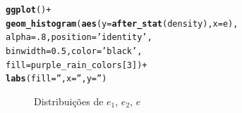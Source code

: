 \documentclass{homework}\usepackage[]{graphicx}\usepackage[]{color}
\makeatletter
\newcommand{\hlnum}[1]{\textcolor[rgb]{0.686,0.059,0.569}{#1}}%
\newcommand{\hlstr}[1]{\textcolor[rgb]{0.192,0.494,0.8}{#1}}%
\newcommand{\hlopt}[1]{\textcolor[rgb]{0,0,0}{#1}}%
\newcommand{\hlstd}[1]{\textcolor[rgb]{0.345,0.345,0.345}{#1}}%
\newcommand{\hlkwc}[1]{\textcolor[rgb]{0.333,0.667,0.333}{#1}}%
\newcommand{\hlkwd}[1]{\textcolor[rgb]{0.737,0.353,0.396}{\textbf{#1}}}%
\newenvironment{kframe}{%
 \def\at@end@of@kframe{}%
 \ifinner\ifhmode%
  \def\at@end@of@kframe{\end{minipage}}%
  \begin{minipage}{\columnwidth}%
 \fi\fi%
 \def\FrameCommand##1{\hskip\@totalleftmargin \hskip-\fboxsep
 \colorbox{shadecolor}{##1}\hskip-\fboxsep
     \hskip-\linewidth \hskip-\@totalleftmargin \hskip\columnwidth}%
 \MakeFramed {\advance\hsize-\width
   \@totalleftmargin\z@ \linewidth\hsize
   \@setminipage}}%
 {\par\unskip\endMakeFramed%
 \at@end@of@kframe}
\newenvironment{knitrout}{}{} %
\makeatother
\begin{document}
\begin{knitrout}
\begin{kframe}
\begin{alltt}
\hlkwd{ggplot}\hlstd{()} \hlopt{+}
  \hlkwd{geom_histogram}\hlstd{(}\hlkwd{aes}\hlstd{(}\hlkwc{y} \hlstd{=} \hlkwd{after_stat}\hlstd{(density),} \hlkwc{x} \hlstd{= e),}
                 \hlkwc{alpha} \hlstd{=} \hlnum{.8}\hlstd{,} \hlkwc{position} \hlstd{=} \hlstr{'identity'}\hlstd{,}
                 \hlkwc{binwidth} \hlstd{=} \hlnum{0.5}\hlstd{,} \hlkwc{color} \hlstd{=} \hlstr{'black'}\hlstd{,}
                 \hlkwc{fill} \hlstd{= purple_rain_colors[}\hlnum{3}\hlstd{])} \hlopt{+}
  \hlkwd{labs}\hlstd{(}\hlkwc{fill} \hlstd{=} \hlstr{''}\hlstd{,} \hlkwc{x} \hlstd{=} \hlstr{''}\hlstd{,} \hlkwc{y} \hlstd{=} \hlstr{''}\hlstd{)}
\end{alltt}
\end{kframe}\begin{figure}
\caption[Distribuições de $e_1$, $e_2$, $e$]{Distribuições de $e_1$, $e_2$, $e$}\label{fig:Simul1}
\end{figure}

\end{knitrout}
\end{document}
